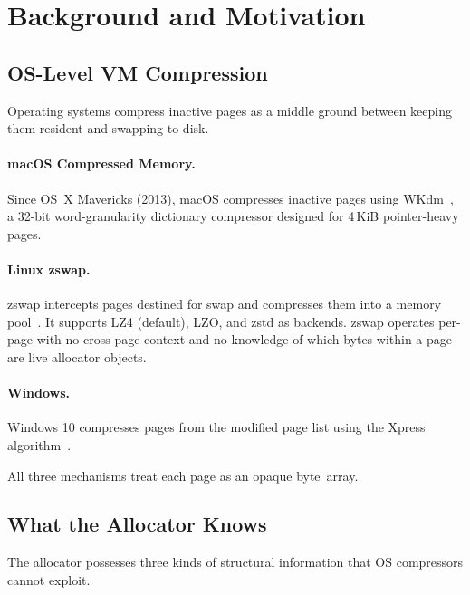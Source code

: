 \section{Background and Motivation}
\label{sec:background}

\subsection{OS-Level VM Compression}

Operating systems compress inactive pages as a middle ground between
keeping them resident and swapping to disk.

\paragraph{macOS Compressed Memory.}  Since OS~X Mavericks
(2013), macOS compresses inactive pages using
WKdm~\cite{wilson1999case,apple2013compressed}, a 32-bit
word-granularity dictionary compressor designed for 4\,KiB
pointer-heavy pages.  

\paragraph{Linux zswap.}  zswap intercepts pages destined for swap
and compresses them into a memory
pool~\cite{jennings2013zswap}.  It supports LZ4 (default), LZO, and
zstd as backends.  zswap operates per-page with no cross-page context
and no knowledge of which bytes within a page are live allocator
objects.

\paragraph{Windows.}  Windows 10 compresses pages from the modified
page list using the Xpress
algorithm~\cite{microsoft2015compression}.

All three mechanisms treat each page as an opaque byte~array.

\subsection{What the Allocator Knows}

The allocator possesses three kinds of structural information that OS
compressors cannot exploit.

